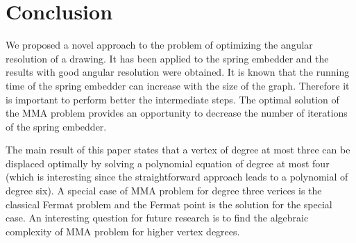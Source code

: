 \documentclass[10pt]{article}
\begin{document}
\section{Conclusion} \label{concl}

We proposed a novel approach to the problem of optimizing the angular resolution of a drawing. 
It has been applied to the spring embedder and the results with good angular resolution were obtained. It is known that the running time of the spring embedder can increase with the size of the graph. Therefore it is important to perform better the intermediate steps. The optimal solution of the MMA problem provides an opportunity to decrease the number of iterations of the spring embedder. 

The main result of this paper states that a vertex of degree at most three can be displaced optimally by solving a polynomial equation of degree at most four (which is interesting since the straightforward approach leads to a polynomial of degree six). A special case of MMA problem for degree three verices is the classical Fermat problem and the Fermat point is the solution for the special case. An interesting question for future research is to find the algebraic complexity of MMA problem for higher vertex degrees.
\end{document}

